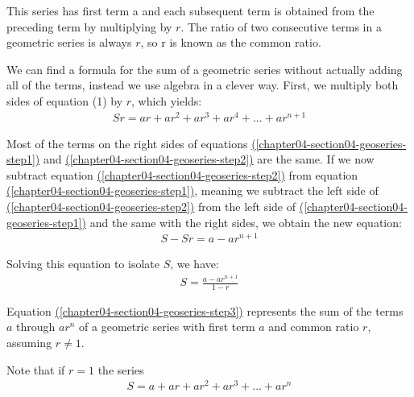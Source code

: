 \documentclass[10pt,]{book}
\theoremstyle{plain}
\theoremstyle{definition}
\theoremstyle{definition}
\theoremstyle{definition}
\numberwithin{equation}{section}
\begin{document}
%
\par
\hypertarget{p-142}{}%
This series has first term a and each subsequent term is obtained from the preceding term by multiplying by \(r\). The ratio of two consecutive terms in a geometric series is always \(r\), so r is known as the common ratio.%
\par
\hypertarget{p-143}{}%
We can find a formula for the sum of a geometric series without actually adding all of the terms, instead we use algebra in a clever way.  First, we multiply both sides of equation (1) by \(r\), which yields:%
\begin{gather}
Sr = ar + ar^2 + ar^3 + ar^4 + ... + ar^{n+1}\label{chapter04-section04-geoseries-step2}
\end{gather}
%
\par
\hypertarget{p-144}{}%
Most of the terms on the right sides of equations \hyperref[chapter04-section04-geoseries-step1]{(\ref{chapter04-section04-geoseries-step1})} and \hyperref[chapter04-section04-geoseries-step2]{(\ref{chapter04-section04-geoseries-step2})} are the same.  If we now subtract equation \hyperref[chapter04-section04-geoseries-step2]{(\ref{chapter04-section04-geoseries-step2})} from equation \hyperref[chapter04-section04-geoseries-step1]{(\ref{chapter04-section04-geoseries-step1})}, meaning we subtract the left side of \hyperref[chapter04-section04-geoseries-step2]{(\ref{chapter04-section04-geoseries-step2})} from the left side of \hyperref[chapter04-section04-geoseries-step1]{(\ref{chapter04-section04-geoseries-step1})} and the same with the right sides, we obtain the new equation:%
\begin{gather*}
S-Sr = a - ar^{n+1}
\end{gather*}
%
\par
\hypertarget{p-145}{}%
Solving this equation to isolate \(S\), we have:%
\begin{gather}
S = \frac{a-ar^{n+1}}{1-r}\label{chapter04-section04-geoseries-step3}
\end{gather}
%
\par
\hypertarget{p-146}{}%
Equation \hyperref[chapter04-section04-geoseries-step3]{(\ref{chapter04-section04-geoseries-step3})} represents the sum of the terms \(a\) through \(ar^n\) of a geometric series with first term \(a\) and common ratio \(r\), assuming \(r \neq 1\).%
\par
\hypertarget{p-147}{}%
Note that if \(r=1\) the series%
\begin{gather*}
S = a + ar + ar^2 + ar^3 + ... + ar^n
\end{gather*}
\end{document}
